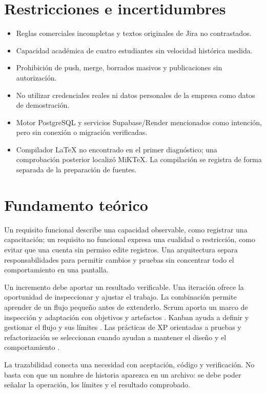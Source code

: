 \section{Restricciones e incertidumbres}
\begin{itemize}
  \item Reglas comerciales incompletas y textos originales de Jira no contrastados.
  \item Capacidad académica de cuatro estudiantes sin velocidad histórica medida.
  \item Prohibición de push, merge, borrados masivos y publicaciones sin autorización.
  \item No utilizar credenciales reales ni datos personales de la empresa como datos de demostración.
  \item Motor PostgreSQL y servicios Supabase/Render mencionados como intención, pero sin conexión o migración verificadas.
  \item Compilador LaTeX no encontrado en el primer diagnóstico; una comprobación posterior localizó MiKTeX. La compilación se registra de forma separada de la preparación de fuentes.
\end{itemize}

\section{Fundamento teórico}
Un requisito funcional describe una capacidad observable, como registrar una capacitación; un requisito no funcional expresa una cualidad o restricción, como evitar que una cuenta sin permiso edite registros. Una arquitectura separa responsabilidades para permitir cambios y pruebas sin concentrar todo el comportamiento en una pantalla.

Un incremento debe aportar un resultado verificable. Una iteración ofrece la oportunidad de inspeccionar y ajustar el trabajo. La combinación permite aprender de un flujo pequeño antes de extenderlo. Scrum aporta un marco de inspección y adaptación con objetivos y artefactos \cite{scrum2020}. Kanban ayuda a definir y gestionar el flujo y sus límites \cite{kanban2025}. Las prácticas de XP orientadas a pruebas y refactorización se seleccionan cuando ayudan a mantener el diseño y el comportamiento \cite{xp}.

La trazabilidad conecta una necesidad con aceptación, código y verificación. No basta con que un nombre de historia aparezca en un archivo: se debe poder señalar la operación, los límites y el resultado comprobado.
